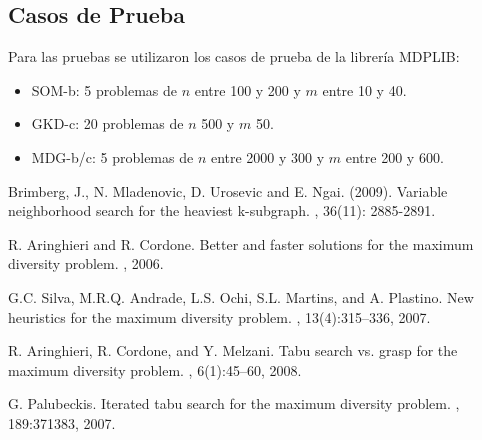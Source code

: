 \documentclass{ci5652}
\begin{document}
\subsection{Casos de Prueba}
Para las pruebas se utilizaron los casos de prueba de la librería MDPLIB:
\begin{itemize}
	\item SOM-b: 5 problemas de $n$ entre 100 y 200 y $m$ entre 10 y 40.
	\item GKD-c: 20 problemas de $n$ 500 y $m$ 50.
	\item MDG-b/c: 5 problemas de $n$ entre 2000 y 300 y $m$ entre 200 y 600.
\end{itemize}

\small


\begin{thebibliography}{99}

Brimberg, J., N. Mladenovic, D. Urosevic and E. Ngai. (2009).
\newblock Variable neighborhood search for the heaviest k-subgraph.
, 36(11): 2885-2891.

R. Aringhieri and R. Cordone.
\newblock Better and faster solutions for the maximum diversity problem.
, 2006.

G.C. Silva, M.R.Q. Andrade, L.S. Ochi, S.L. Martins, and A. Plastino.
\newblock New heuristics for the maximum diversity problem.
, 13(4):315–336, 2007.

R. Aringhieri, R. Cordone, and Y. Melzani.
\newblock Tabu search vs. grasp for the maximum diversity problem.
, 6(1):45–60, 2008.

G. Palubeckis.
\newblock Iterated tabu search for the maximum diversity problem.
, 189:371383, 2007.




\end{thebibliography}
\end{document}
